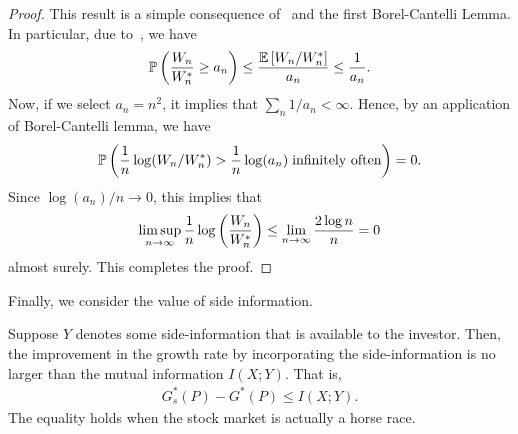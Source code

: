     \begin{proof}
        This result is a simple consequence of~ and the first Borel-Cantelli Lemma. In particular, due to~, we have 
        \begin{align}
            \mathbb{P}\left( \frac{W_n}{W_n^*} \geq a_n \right) \leq \frac{\mathbb{E}\left[ W_n/W_n^* \right]}{a_n} \leq \frac{1}{a_n}. 
        \end{align}
        Now, if we select $a_n=n^2$, it implies that $\sum_{n} 1/a_n < \infty$. Hence, by an application of Borel-Cantelli lemma, we have 
        \begin{align}
            \mathbb{P}\left( \frac{1}{n} \log (W_n/W_n^*) > \frac{1}{n}\log (a_n) \; \text{infinitely often} \right)  = 0. 
        \end{align}
        Since $\log(a_n)/n \to 0$, this implies that 
        \begin{align}
            \limsup_{n \to \infty} \frac{1}{n} \log \left( \frac{W_n}{W_n^*} \right) \leq \lim_{n\to \infty} \frac{2 \log n}{n}  = 0 
        \end{align}
        almost surely. 
        This completes the proof. 
    \end{proof}

    Finally, we consider the value of side information. 
    \begin{proposition}
        \label{prop:side-info-stock} Suppose $Y$ denotes some side-information that is available to the investor. Then, the improvement in the growth rate by incorporating the side-information is no larger than the mutual information $I(X;Y)$. That is, 
        \begin{align}
            G^*_s(P) - G^*(P) \leq I(X;Y). 
        \end{align}
        The equality holds when the stock market is actually a horse race. 
    \end{proposition}
